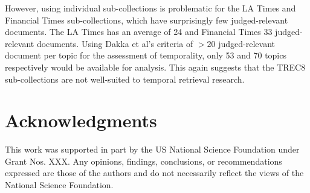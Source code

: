 \documentclass[runningheads,a4paper]{llncs}
\begin{document}
However, using individual sub-collections is problematic for the LA Times and Financial Times sub-collections, which have surprisingly few judged-relevant documents. The LA Times has an average of 24 and Financial Times 33 judged-relevant documents.  Using Dakka et al's criteria of $>20$ judged-relevant document per topic for the assessment of temporality, only 53 and 70 topics respectively would be available for analysis. This again suggests that the TREC8 sub-collections are not well-suited to temporal retrieval research.
	
\section{Acknowledgments}
This work was supported in part by the US National Science Foundation under Grant Nos. XXX. Any opinions, findings, conclusions, or recommendations expressed are those of the authors and do not necessarily reflect the views of the National Science Foundation. 


  
\end{document}

